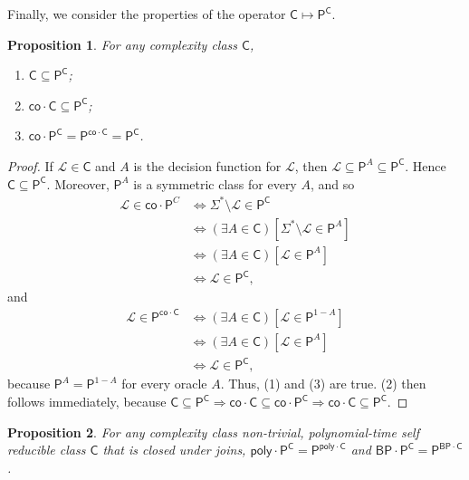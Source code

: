 \documentclass[12pt]{amsart}
\newtheorem*{proposition}{Proposition}
\theoremstyle{definition}
\theoremstyle{remark}
\newcommand{\cL}{\mathcal{L}}
\newcommand{\sC}{\mathsf{C}}
\newcommand{\co}{\mathsf{co}}
\newcommand{\sP}{\mathsf{P}}
\newcommand{\poly}{\mathsf{poly}}
\newcommand{\msf}[1]{\mathsf{#1}}
\newcommand{\BP}{\msf{BP}}
\begin{document}
Finally, we consider the properties of the operator $\sC\mapsto\sP^\sC$.
\begin{proposition}
For any complexity class $\sC$,
\begin{enumerate}
\item $\sC\subseteq\sP^\sC$;
\item $\co\cdot\sC\subseteq\sP^\sC$;
\item $\co\cdot\sP^\sC=\sP^{\co\cdot\sC}=\sP^\sC$.
\end{enumerate}
\end{proposition}
\begin{proof}
If $\cL\in\sC$ and $A$ is the decision function for $\cL$, then
$\cL\subseteq\sP^A\subseteq\sP^\sC$. Hence $\sC\subseteq\sP^\sC$. Moreover,
$\sP^A$ is a symmetric class for every $A$, and so
\begin{align*}
\cL\in\co\cdot\sP^C
&\Longleftrightarrow\Sigma^*\setminus\cL\in\sP^\sC \\
&\Longleftrightarrow(\exists A\in\sC)[\Sigma^*\setminus\cL\in\sP^A] \\
&\Longleftrightarrow(\exists A\in\sC)[\cL\in\sP^A] \\
&\Longleftrightarrow\cL\in\sP^\sC,
\end{align*}
and
\begin{align*}
\cL\in\sP^{\co\cdot\sC}
&\Longleftrightarrow(\exists A\in\sC)[\cL\in\sP^{1-A}] \\
&\Longleftrightarrow(\exists A\in\sC)[\cL\in\sP^A] \\
&\Longleftrightarrow\cL\in\sP^\sC,
\end{align*}
because $\sP^A=\sP^{1-A}$ for every oracle $A$. Thus, (1) and (3) are true. (2)
then follows immediately, because
$\sC\subseteq\sP^\sC\Longrightarrow\co\cdot\sC
\subseteq\co\cdot\sP^\sC\Longrightarrow\co\cdot\sC\subseteq\sP^\sC$.
\end{proof}

\begin{proposition}
For any complexity class non-trivial, polynomial-time self reducible class
$\sC$ that is closed under joins, $\poly\cdot\sP^\sC=\sP^{\poly\cdot\sC}$ and
$\BP\cdot\sP^\sC=\sP^{\BP\cdot\sC}$.
\end{proposition}
\end{document}
